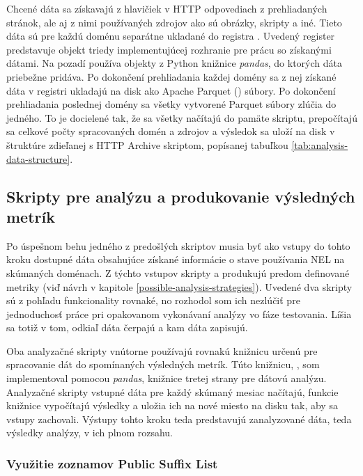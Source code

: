 Chcené dáta sa získavajú z hlavičiek v HTTP odpovediach z prehliadaných stránok, ale aj z nimi používaných zdrojov ako sú obrázky, skripty a iné.
Tieto dáta sú pre každú doménu separátne ukladané do registra .
Uvedený register predstavuje objekt triedy implementujúcej rozhranie pre prácu so získanými dátami. 
Na pozadí používa  objekty z Python knižnice \textit{pandas}, do ktorých dáta priebežne pridáva.
Po dokončení prehliadania každej domény sa z nej získané dáta v registri ukladajú na disk ako Apache Parquet () súbory.
Po dokončení prehliadania poslednej domény sa všetky vytvorené Parquet súbory zlúčia do jedného.
To je docielené tak, že sa všetky načítajú do pamäte skriptu, prepočítajú sa celkové počty spracovaných domén a zdrojov a výsledok sa uloží na disk v štruktúre zdieľanej s HTTP Archive skriptom, popísanej tabuľkou \ref{tab:analysis-data-structure}.

\subsection{Skripty pre analýzu a produkovanie výsledných metrík}

Po úspešnom behu jedného z predošlých skriptov musia byť ako vstupy do tohto kroku dostupné dáta obsahujúce získané informácie o stave používania NEL na skúmaných doménach.
Z týchto vstupov skripty  a  produkujú predom definované metriky (viď návrh v kapitole \ref{possible-analysis-strategies}).
Uvedené dva skripty sú z pohľadu funkcionality rovnaké, no rozhodol som ich nezlúčiť pre jednoduchosť práce pri opakovanom vykonávaní analýzy vo fáze testovania.
Líšia sa totiž v tom, odkiaľ dáta čerpajú a kam dáta zapisujú.

Oba analyzačné skripty vnútorne používajú rovnakú knižnicu určenú pre spracovanie dát do spomínaných výsledných metrík.
Túto knižnicu, , som implementoval pomocou \textit{pandas}, knižnice tretej strany pre dátovú analýzu.
Analyzačné skripty vstupné dáta pre každý skúmaný mesiac načítajú, funkcie knižnice vypočítajú výsledky a uložia ich na nové miesto na disku tak, aby sa vstupy zachovali.
Výstupy tohto kroku teda predstavujú zanalyzované dáta, teda výsledky analýzy, v ich plnom rozsahu.

\subsubsection{Využitie zoznamov Public Suffix List}

